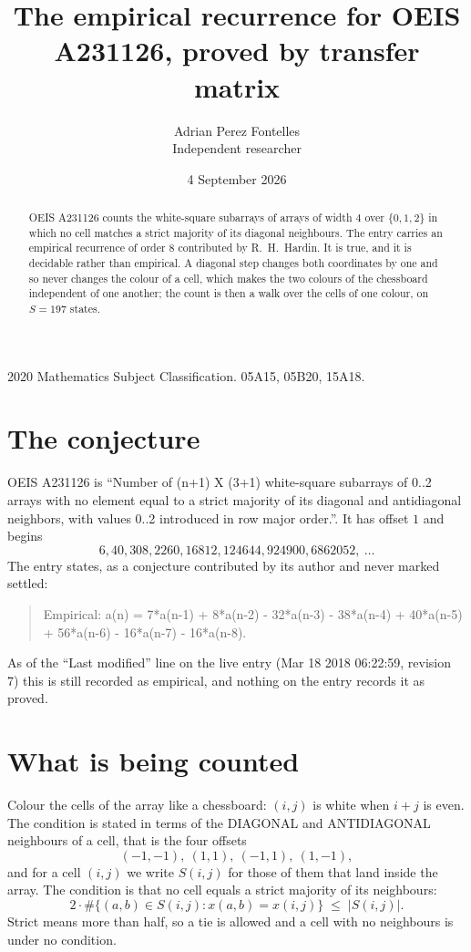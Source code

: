 \documentclass[11pt,a4paper]{article}
\title{The empirical recurrence for OEIS A231126, proved by transfer matrix}
\author{Adrian Perez Fontelles\\ \small Independent researcher}
\date{4 September 2026}
\theoremstyle{plain}
\theoremstyle{definition}
\begin{document}
\maketitle

\begin{abstract}
OEIS A231126 counts the white-square subarrays of arrays of width $4$ over $\{0,1,2\}$ in which
no cell matches a strict majority of its diagonal neighbours. The entry carries an empirical recurrence of order $8$ contributed by
R.~H.~Hardin. It is true, and it is decidable rather than empirical. A diagonal step changes
both coordinates by one and so never changes the colour of a cell, which makes the two colours
of the chessboard independent of one another; the count is then a walk over the cells of one
colour, on $S=197$ states.
\end{abstract}

\noindent\small 2020 Mathematics Subject Classification. 05A15, 05B20, 15A18.\normalsize

\section{The conjecture}

OEIS A231126 is ``Number of (n+1) X (3+1) white-square subarrays of 0..2 arrays with no element equal to a strict majority of its diagonal and antidiagonal neighbors, with values 0..2 introduced in row major order.''. It has offset $1$ and begins
\[
6, 40, 308, 2260, 16812, 124644, 924900, 6862052,\ \dots
\]
The entry states, as a conjecture contributed by its author and never marked settled:
\begin{quote}
Empirical: a(n) = 7*a(n-1) + 8*a(n-2) - 32*a(n-3) - 38*a(n-4) + 40*a(n-5) + 56*a(n-6) - 16*a(n-7) - 16*a(n-8).
\end{quote}
As of the ``Last modified'' line on the live entry (Mar 18 2018 06:22:59, revision 7) this is still
recorded as empirical, and nothing on the entry records it as proved.

\section{What is being counted}

Colour the cells of the array like a chessboard: $(i,j)$ is white when $i+j$ is even. The
condition is stated in terms of the DIAGONAL and ANTIDIAGONAL neighbours of a cell, that is the
four offsets
\[
(-1,-1),\ (1,1),\ (-1,1),\ (1,-1),
\]
and for a cell $(i,j)$ we write $S(i,j)$ for those of them that land inside the array. The
condition is that no cell equals a strict majority of its neighbours:
\[
2\cdot\#\{(a,b)\in S(i,j) : x(a,b)=x(i,j)\}\;\le\;|S(i,j)| .
\]
Strict means more than half, so a tie is allowed and a cell with no neighbours is under no condition.
\end{document}
